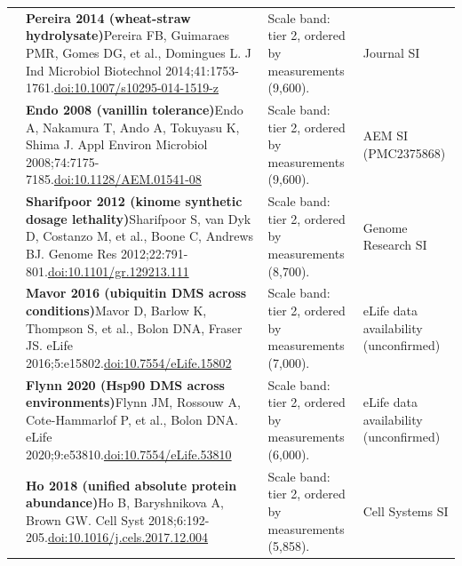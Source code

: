 \begin{landscape}
\begin{longtable}{@{}r@{\hspace{4pt}} L{86mm} L{92mm} L{62mm}@{}}
 & \textbf{Pereira 2014 (wheat-straw hydrolysate)}\newline Pereira FB, Guimaraes PMR, Gomes DG, et al., Domingues L. J Ind Microbiol Biotechnol 2014;41:1753-1761.\newline \href{https://doi.org/10.1007/s10295-014-1519-z}{doi:10.1007/\allowbreak s10295-014-1519-z} & Scale band: tier 2, ordered by measurements (9,600). & Journal SI \\
 & \textbf{Endo 2008 (vanillin tolerance)}\newline Endo A, Nakamura T, Ando A, Tokuyasu K, Shima J. Appl Environ Microbiol 2008;74:7175-7185.\newline \href{https://doi.org/10.1128/AEM.01541-08}{doi:10.1128/\allowbreak AEM.01541-08} & Scale band: tier 2, ordered by measurements (9,600). & AEM SI (PMC2375868) \\
 & \textbf{Sharifpoor 2012 (kinome synthetic dosage lethality)}\newline Sharifpoor S, van Dyk D, Costanzo M, et al., Boone C, Andrews BJ. Genome Res 2012;22:791-801.\newline \href{https://doi.org/10.1101/gr.129213.111}{doi:10.1101/\allowbreak gr.129213.111} & Scale band: tier 2, ordered by measurements (8,700). & Genome Research SI \\
 & \textbf{Mavor 2016 (ubiquitin DMS across conditions)}\newline Mavor D, Barlow K, Thompson S, et al., Bolon DNA, Fraser JS. eLife 2016;5:e15802.\newline \href{https://doi.org/10.7554/eLife.15802}{doi:10.7554/\allowbreak eLife.15802} & Scale band: tier 2, ordered by measurements (7,000). & eLife data availability (unconfirmed) \\
 & \textbf{Flynn 2020 (Hsp90 DMS across environments)}\newline Flynn JM, Rossouw A, Cote-Hammarlof P, et al., Bolon DNA. eLife 2020;9:e53810.\newline \href{https://doi.org/10.7554/eLife.53810}{doi:10.7554/\allowbreak eLife.53810} & Scale band: tier 2, ordered by measurements (6,000). & eLife data availability (unconfirmed) \\
 & \textbf{Ho 2018 (unified absolute protein abundance)}\newline Ho B, Baryshnikova A, Brown GW. Cell Syst 2018;6:192-205.\newline \href{https://doi.org/10.1016/j.cels.2017.12.004}{doi:10.1016/\allowbreak j.cels.2017.12.004} & Scale band: tier 2, ordered by measurements (5,858). & Cell Systems SI \\

\end{longtable}
\end{landscape}
